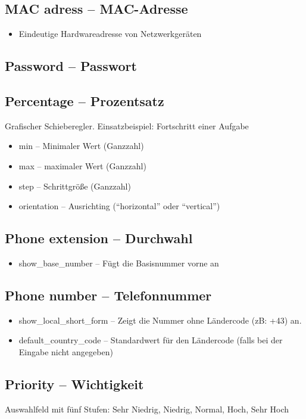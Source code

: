 \documentclass[article, a4paper, oneside, 11pt]{memoir}
\begin{document}
\subsection{MAC adress -- MAC-Adresse}
\begin{itemize}
\item Eindeutige Hardwareadresse von Netzwerkgeräten
\end{itemize}
\subsection{Password -- Passwort}
\subsection{Percentage -- Prozentsatz}
Grafischer Schieberegler. Einsatzbeispiel: Fortschritt einer Aufgabe

\begin{itemize}
\item min -- Minimaler Wert (Ganzzahl)
\item max -- maximaler Wert (Ganzzahl)
\item step -- Schrittgröße (Ganzzahl)
\item orientation -- Ausrichting ("`horizontal"' oder "`vertical"')
\end{itemize}
\subsection{Phone extension -- Durchwahl}
\begin{itemize}
\item show\_base\_number -- Fügt die Basisnummer vorne an
\end{itemize}
\subsection[Phone number -- Telefonnummer]{Phone number -- Telefonnummer}
\begin{itemize}
\item show\_local\_short\_form -- Zeigt die Nummer ohne Ländercode (zB: +43) an.
\item default\_country\_code -- Standardwert für den Ländercode (falls bei der Eingabe nicht angegeben)
\end{itemize}
\subsection{Priority -- Wichtigkeit}
Auswahlfeld mit fünf Stufen: Sehr Niedrig, Niedrig, Normal, Hoch, Sehr Hoch
\end{document}
